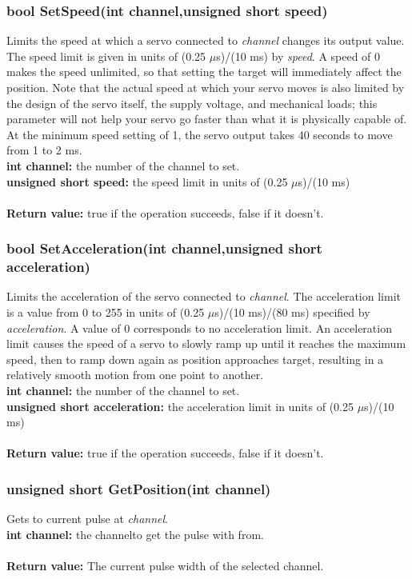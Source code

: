 \documentclass[letterpaper]{book}
\begin{document}
\subsubsection{bool SetSpeed(int channel,unsigned short speed)}
Limits the speed at which a servo connected to \textit{channel} changes its output value. The speed limit is given in units of
(0.25 $\mu$s)/(10 ms) by \textit{speed}. A speed of 0 makes the speed unlimited, so that setting the target will immediately affect the position.
Note that the actual speed at which your servo moves is also limited by the design of the servo itself, the supply
voltage, and mechanical loads; this parameter will not help your servo go faster than what it is physically capable of.
At the minimum speed setting of 1, the servo output takes 40 seconds to move from 1 to 2 ms.\\

\textbf{int channel: }the number of the channel to set.\\
\textbf{unsigned short speed: } the speed limit in units of
(0.25 $\mu$s)/(10 ms)\\\\
\textbf{Return value: } true if the operation succeeds, false if it doesn't.

\subsubsection{bool SetAcceleration(int channel,unsigned short acceleration)}
Limits the acceleration of the servo connected to \textit{channel}. The acceleration limit is a value from 0 to 255
in units of (0.25 $\mu$s)/(10 ms)/(80 ms) specified by \textit{acceleration}. A value of 0 corresponds to no acceleration limit. An acceleration limit causes the speed of a servo to slowly ramp up until it reaches the maximum
speed, then to ramp down again as position approaches target, resulting in a relatively smooth motion from one point
to another.\\
\textbf{int channel: }the number of the channel to set.\\
\textbf{unsigned short acceleration: } the acceleration limit in units of
(0.25 $\mu$s)/(10 ms)\\\\
\textbf{Return value: } true if the operation succeeds, false if it doesn't.

\subsubsection{unsigned short GetPosition(int channel)}
Gets to current pulse at \textit{channel}.\\
\textbf{int channel: } the channelto get the pulse with from.\\\\
\textbf{Return value: } The current pulse width of the selected channel.
\end{document}
